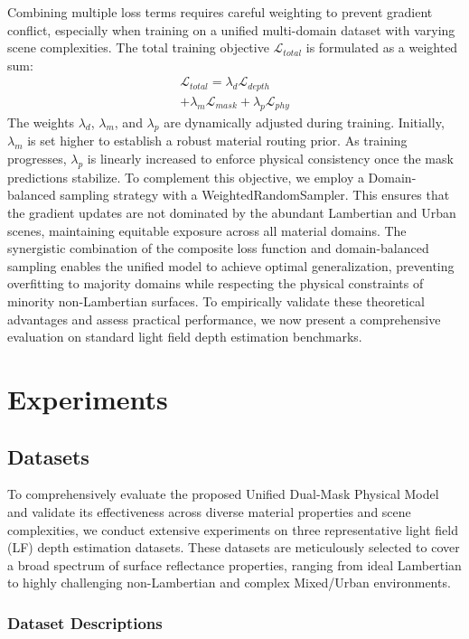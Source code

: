 \documentclass[lettersize,journal]{IEEEtran}
\begin{document}
Combining multiple loss terms requires careful weighting to prevent gradient conflict, especially when training on a unified multi-domain dataset with varying scene complexities. The total training objective $\mathcal{L}_{total}$ is formulated as a weighted sum:
\begin{multline}

\mathcal{L}_{total} = \lambda_d \mathcal{L}_{depth} \\
+ \lambda_m \mathcal{L}_{mask} + \lambda_p \mathcal{L}_{phy}
\end{multline}
The weights $\lambda_d$, $\lambda_m$, and $\lambda_p$ are dynamically adjusted during training. Initially, $\lambda_m$ is set higher to establish a robust material routing prior. As training progresses, $\lambda_p$ is linearly increased to enforce physical consistency once the mask predictions stabilize. To complement this objective, we employ a Domain-balanced sampling strategy with a WeightedRandomSampler. This ensures that the gradient updates are not dominated by the abundant Lambertian and Urban scenes, maintaining equitable exposure across all material domains. The synergistic combination of the composite loss function and domain-balanced sampling enables the unified model to achieve optimal generalization, preventing overfitting to majority domains while respecting the physical constraints of minority non-Lambertian surfaces. To empirically validate these theoretical advantages and assess practical performance, we now present a comprehensive evaluation on standard light field depth estimation benchmarks.

\section{Experiments}

\subsection{Datasets}

To comprehensively evaluate the proposed Unified Dual-Mask Physical Model and validate its effectiveness across diverse material properties and scene complexities, we conduct extensive experiments on three representative light field (LF) depth estimation datasets. These datasets are meticulously selected to cover a broad spectrum of surface reflectance properties, ranging from ideal Lambertian to highly challenging non-Lambertian and complex Mixed/Urban environments.

\subsubsection{Dataset Descriptions}
\end{document}
